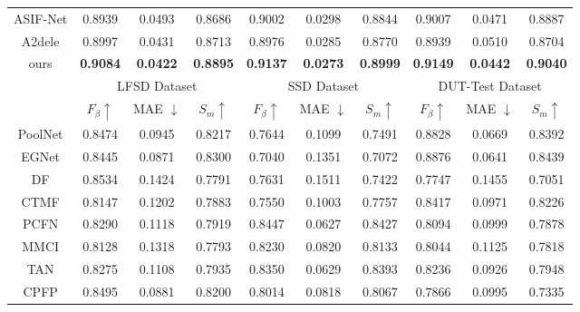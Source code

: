 \documentclass[runningheads]{llncs}
\begin{document}
\begin{table*}[t]
\begin{center}
\begin{tabular}{|c|c|c|c||c|c|c||c|c|c|}
			ASIF-Net \cite{ASIF-Net} & 0.8939 & 0.0493 & 0.8686 & 0.9002 & 0.0298 & 0.8844 & 0.9007 & 0.0471 & 0.8887  \\
			
			A2dele \cite{A2dele} & 0.8997 & 0.0431 & 0.8713 & 0.8976 & 0.0285 & 0.8770 & 0.8939 & 0.0510 & 0.8704  \\
			
			
			ours & \textbf{0.9084} & \textbf{0.0422} & \textbf{0.8895} & \textbf{0.9137} & \textbf{0.0273} & \textbf{0.8999} & \textbf{0.9149} & \textbf{0.0442} & \textbf{0.9040}  \\
			\hline
			\hline
			\multirow{2}{*}{} & \multicolumn{3}{c||}{LFSD Dataset} & \multicolumn{3}{c||}{SSD Dataset} & \multicolumn{3}{c|}{DUT-Test Dataset} \\[0.5ex]
			\cline{2-10}
			& $F_{\beta}\uparrow$ & MAE $\downarrow$ & $S_m \uparrow$ & $F_{\beta}\uparrow$ & MAE $\downarrow$ & $S_m \uparrow$ & $F_{\beta}\uparrow$ & MAE $\downarrow$ & $S_m \uparrow$  \\
			\hline\hline
			
			PoolNet \cite{PoolNet} & 0.8474 & 0.0945 & 0.8217 & 0.7644 & 0.1099 & 0.7491 & 0.8828 & 0.0669 & 0.8392 \\
			
			
			EGNet \cite{EGNet} & 0.8445 & 0.0871 & 0.8300 & 0.7040 & 0.1351 & 0.7072 & 0.8876 & 0.0641 & 0.8439 \\
			
			DF \cite{DF}      & 0.8534 & 0.1424 & 0.7791 & 0.7631 & 0.1511 & 0.7422 & 0.7747 & 0.1455 & 0.7051 \\
			
			CTMF \cite{CTMF}  & 0.8147 & 0.1202 & 0.7883 & 0.7550 & 0.1003 & 0.7757 & 0.8417 & 0.0971 & 0.8226 \\
			
			PCFN \cite{PCFN}  & 0.8290 & 0.1118 & 0.7919 & 0.8447 & 0.0627 & 0.8427 & 0.8094 & 0.0999 & 0.7878 \\
			
			MMCI \cite{MMCI}  & 0.8128 & 0.1318 & 0.7793 & 0.8230 & 0.0820 & 0.8133 & 0.8044 & 0.1125 & 0.7818 \\
			
			TAN \cite{TAN}    & 0.8275 & 0.1108 & 0.7935 & 0.8350 & 0.0629 & 0.8393 & 0.8236 & 0.0926 & 0.7948 \\
			
			CPFP \cite{CPFP}  & 0.8495 & 0.0881 & 0.8200 & 0.8014 & 0.0818 & 0.8067 & 0.7866 & 0.0995 & 0.7335 \\
			

\end{tabular}
\end{center}
\end{table*}
\end{document}
